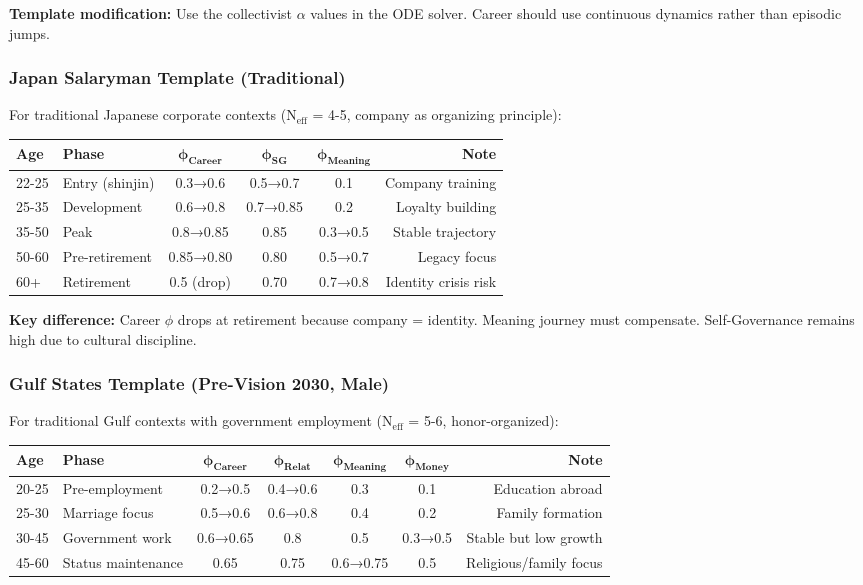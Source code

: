 \textbf{Template modification:} Use the collectivist $\alpha$ values in the ODE solver.
Career should use continuous dynamics rather than episodic jumps.

\subsubsection{Japan Salaryman Template (Traditional)}

For traditional Japanese corporate contexts (N$_{\text{eff}}$ = 4-5, company as organizing principle):

\begin{center}
\small
\begin{tabular}{@{}llcccr@{}}
\toprule
\textbf{Age} & \textbf{Phase} & $\boldsymbol{\phi_{Career}}$ & $\boldsymbol{\phi_{SG}}$ & $\boldsymbol{\phi_{Meaning}}$ & \textbf{Note} \\
\midrule
22-25 & Entry (shinjin) & 0.3→0.6 & 0.5→0.7 & 0.1 & Company training \\
25-35 & Development & 0.6→0.8 & 0.7→0.85 & 0.2 & Loyalty building \\
35-50 & Peak & 0.8→0.85 & 0.85 & 0.3→0.5 & Stable trajectory \\
50-60 & Pre-retirement & 0.85→0.80 & 0.80 & 0.5→0.7 & Legacy focus \\
60+ & Retirement & 0.5 (drop) & 0.70 & 0.7→0.8 & Identity crisis risk \\
\bottomrule
\end{tabular}
\end{center}

\textbf{Key difference:} Career $\phi$ drops at retirement because company = identity.
Meaning journey must compensate. Self-Governance remains high due to cultural discipline.

\subsubsection{Gulf States Template (Pre-Vision 2030, Male)}

For traditional Gulf contexts with government employment (N$_{\text{eff}}$ = 5-6, honor-organized):

\begin{center}
\small
\begin{tabular}{@{}llccccr@{}}
\toprule
\textbf{Age} & \textbf{Phase} & $\boldsymbol{\phi_{Career}}$ & $\boldsymbol{\phi_{Relat}}$ & $\boldsymbol{\phi_{Meaning}}$ & $\boldsymbol{\phi_{Money}}$ & \textbf{Note} \\
\midrule
20-25 & Pre-employment & 0.2→0.5 & 0.4→0.6 & 0.3 & 0.1 & Education abroad \\
25-30 & Marriage focus & 0.5→0.6 & 0.6→0.8 & 0.4 & 0.2 & Family formation \\
30-45 & Government work & 0.6→0.65 & 0.8 & 0.5 & 0.3→0.5 & Stable but low growth \\
45-60 & Status maintenance & 0.65 & 0.75 & 0.6→0.75 & 0.5 & Religious/family focus \\
\bottomrule
\end{tabular}
\end{center}

